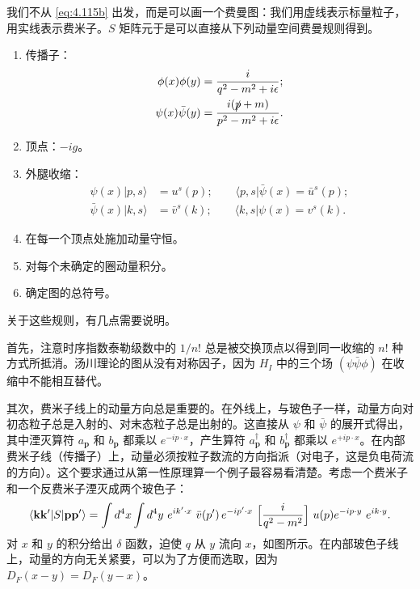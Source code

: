 我们不从 \eqref{eq:4.115b} 出发，而是可以画一个费曼图：我们用虚线表示标量粒子，用实线表示费米子。$S$ 矩阵元于是可以直接从下列动量空间费曼规则得到。
\begin{enumerate}
  \item 传播子：
    \begin{align}
      \phi(x)\phi(y) &= \frac{i}{q^2-m^2+i\epsilon};\label{eq:4.117a}\\
      \psi(x)\bar{\psi}(y) &= \frac{i(\slashed{p}+m)}{p^2-m^2+i\epsilon}
        .\label{eq:4.117b}
    \end{align}
  \item 顶点：$-ig$。
  \item 外腿收缩：
    \begin{align}
      \psi(x)|p, s\rangle &= u^s(p);\qquad
      \langle p, s|\bar{\psi}(x) = \bar{u}^s(p);\nonumber\\
      \bar{\psi}(x)|k, s\rangle &= \bar{v}^s(k);\qquad
      \langle k, s|\psi(x) = v^s(k) .
    \end{align}
  \item 在每一个顶点处施加动量守恒。
  \item 对每个未确定的圈动量积分。
  \item 确定图的总符号。
\end{enumerate}
关于这些规则，有几点需要说明。

首先，注意时序指数泰勒级数中的 $1/n!$ 总是被交换顶点以得到同一收缩的 $n!$ 种方式所抵消。汤川理论的图从没有对称因子，因为 $H_I$ 中的三个场 $(\psi\bar{\psi}\phi)$ 在收缩中不能相互替代。

其次，费米子线上的动量方向总是重要的。在外线上，与玻色子一样，动量方向对初态粒子总是入射的、对末态粒子总是出射的。这直接从 $\psi$ 和 $\bar{\psi}$ 的展开式得出，其中湮灭算符 $a_{\mathbf{p}}$ 和 $b_{\mathbf{p}}$ 都乘以 $e^{-ip\cdot x}$，产生算符 $a_{\mathbf{p}}^\dagger$ 和 $b_{\mathbf{p}}^\dagger$ 都乘以 $e^{+ip\cdot x}$。在内部费米子线（传播子）上，动量必须按粒子数流的方向指派（对电子，这是负电荷流的方向）。这个要求通过从第一性原理算一个例子最容易看清楚。考虑一个费米子和一个反费米子湮灭成两个玻色子：
\begin{equation}
  \langle \mathbf{k}\mathbf{k}'|S|\mathbf{p}\mathbf{p}'\rangle
    = \int d^4x\int d^4y\ e^{ik'\cdot x}\ \bar{v}(p')\,e^{-ip'\cdot x}\
      \Bigl[ \frac{i}{q^2-m^2} \Bigr]\ u(p)e^{-ip\cdot y}\ e^{ik\cdot y} .
  \label{eq:4.118}
\end{equation}
对 $x$ 和 $y$ 的积分给出 $\delta$ 函数，迫使 $q$ 从 $y$ 流向 $x$，如图所示。在内部玻色子线上，动量的方向无关紧要，可以为了方便而选取，因为 $D_F(x-y) = D_F(y-x)$。

